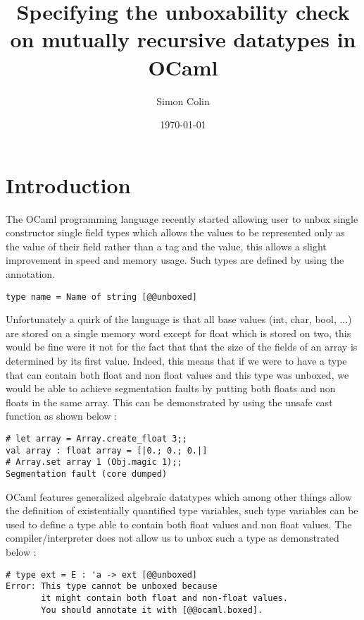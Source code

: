 \documentclass[a4]{article}
\title{Specifying the unboxability check on mutually recursive datatypes in OCaml}
\author{Simon Colin}
\date{\today}
\begin{document}
\maketitle

\section{Introduction}

The OCaml programming language recently started allowing user to unbox single constructor single field types which allows the values to be represented only as the value of their field rather than a tag and the value, this allows a slight improvement in speed and memory usage. Such types are defined by using the \code{[@@unboxed]} annotation.

\begin{lstlisting}
type name = Name of string [@@unboxed]
\end{lstlisting}

Unfortunately a quirk of the language is that all base values (int, char, bool, ...) are stored on a single memory word except for float which is stored on two, this would be fine were it not for the fact that that the size of the fields of an array is determined by its first value. Indeed, this means that if we were to have a type that can contain both float and non float values and this type was unboxed, we would be able to achieve segmentation faults by putting both floats and non floats in the same array. This can be demonstrated by using the unsafe cast function  as shown below :

\begin{lstlisting}
# let array = Array.create_float 3;;
val array : float array = [|0.; 0.; 0.|]
# Array.set array 1 (Obj.magic 1);;
Segmentation fault (core dumped)
\end{lstlisting}
OCaml features generalized algebraic datatypes which among other things allow the definition of existentially quantified type variables, such type variables can be used to define a type able to contain both float values and non float values. The compiler/interpreter does not allow us to unbox such a type as demonstrated below :

\begin{lstlisting}
# type ext = E : 'a -> ext [@@unboxed]
Error: This type cannot be unboxed because
       it might contain both float and non-float values.
       You should annotate it with [@@ocaml.boxed].
\end{lstlisting}
\end{document}
